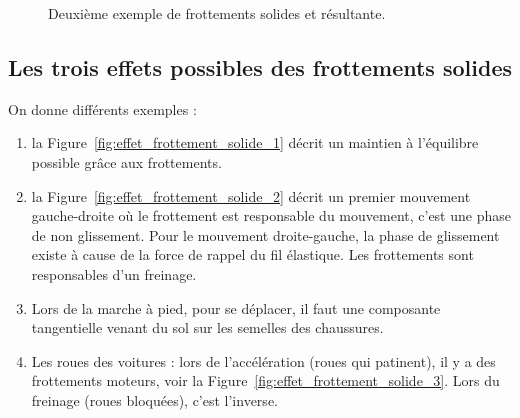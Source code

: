         \begin{figure}
            \centering
            \caption{Deuxième exemple de frottements solides et résultante.}    
            \label{fig:resultante_2}
        \end{figure}

    \subsection{Les trois effets possibles des frottements solides}

        On donne différents exemples :
        \begin{enumerate}
            \item la Figure~\ref{fig:effet_frottement_solide_1} décrit un maintien à l'équilibre possible grâce aux frottements.
            \item la Figure~\ref{fig:effet_frottement_solide_2} décrit un premier mouvement gauche-droite où le frottement est responsable du mouvement, c'est une phase de non glissement. Pour le mouvement droite-gauche, la phase de glissement existe à cause de la force de rappel du fil élastique. Les frottements sont responsables d'un freinage.
            \item Lors de la marche à pied, pour se déplacer, il faut une composante tangentielle venant du sol sur les semelles des chaussures.
            \item Les roues des voitures : lors de l'accélération (roues qui patinent), il y a des frottements moteurs, voir la Figure~\ref{fig:effet_frottement_solide_3}. Lors du freinage (roues bloquées), c'est l'inverse.
        \end{enumerate}

